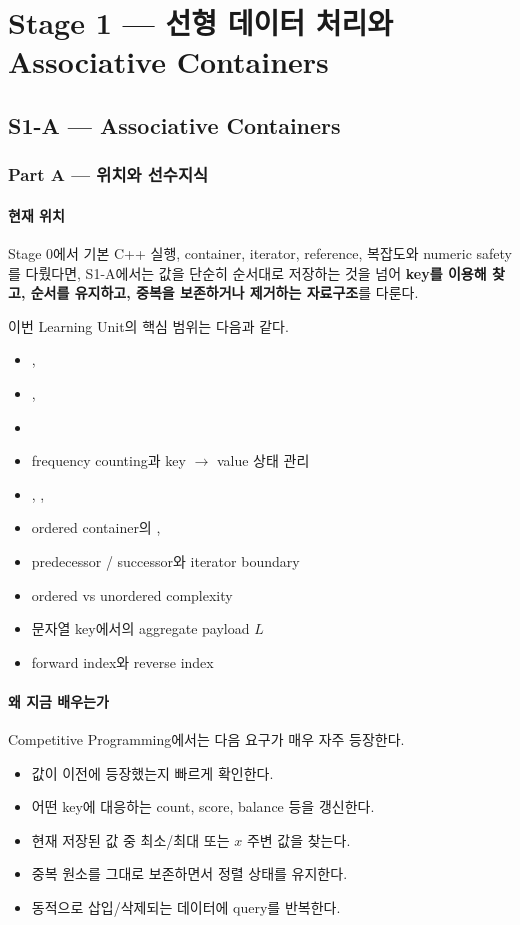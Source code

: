 \part{Stage 1 --- 선형 데이터 처리와 Associative Containers}
\chapter{S1-A --- Associative Containers}

\section{Part A --- 위치와 선수지식}

\subsection{현재 위치}
Stage 0에서 기본 C++ 실행, container, iterator, reference, 복잡도와 numeric safety를 다뤘다면, S1-A에서는 값을 단순히 순서대로 저장하는 것을 넘어 \textbf{key를 이용해 찾고, 순서를 유지하고, 중복을 보존하거나 제거하는 자료구조}를 다룬다.

이번 Learning Unit의 핵심 범위는 다음과 같다.
\begin{itemize}
\item {}, 
\item {}, 
\item {}
\item frequency counting과 key $\to$ value 상태 관리
\item {}, , 
\item ordered container의 , 
\item predecessor / successor와 iterator boundary
\item ordered vs unordered complexity
\item 문자열 key에서의 aggregate payload $L$
\item forward index와 reverse index
\end{itemize}

\subsection{왜 지금 배우는가}
Competitive Programming에서는 다음 요구가 매우 자주 등장한다.
\begin{itemize}
\item 값이 이전에 등장했는지 빠르게 확인한다.
\item 어떤 key에 대응하는 count, score, balance 등을 갱신한다.
\item 현재 저장된 값 중 최소/최대 또는 $x$ 주변 값을 찾는다.
\item 중복 원소를 그대로 보존하면서 정렬 상태를 유지한다.
\item 동적으로 삽입/삭제되는 데이터에 query를 반복한다.
\end{itemize}

